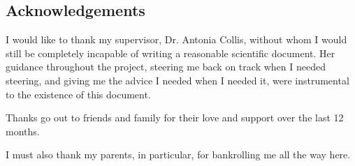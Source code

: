 \documentclass[12pt,a4paper]{report}
\begin{document}
%
%

\tableofcontents
\listoftables
\listoffigures


%
%

\begin{titlepage}
\vspace*{2in}

%
%

\section*{Acknowledgements}

I would like to thank my supervisor, Dr. Antonia Collis, without whom
I would still be completely incapable of writing a reasonable scientific
document.
%
Her guidance throughout the project, steering me back on track when I
needed steering, and giving me the advice I needed when I needed it,
were instrumental to the existence of this document.

Thanks go out to friends and family for their love and support
over the last 12 months. 

I must also thank my parents, in particular,
for bankrolling me all the way here.



\end{titlepage}




%
%









\end{document}
